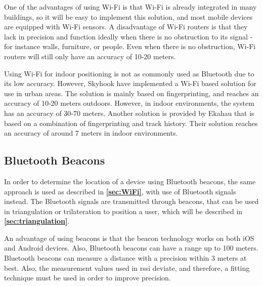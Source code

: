 One of the advantages of using Wi-Fi is that Wi-Fi is already integrated in many buildings, so it will be easy to implement this solution, and most mobile devices are equipped with Wi-Fi sensors.
A disadvantage of Wi-Fi routers is that they lack in precision and function ideally when there is no obstruction to its signal - for instance walls, furniture, or people. Even when there is no obstruction, Wi-Fi routers will still only have an accuracy of 10-20 meters.\cite{oriient}

Using Wi-Fi for indoor positioning is not as commonly used as Bluetooth due to its low accuracy. However, Skyhook have implemented a Wi-Fi based solution for use in urban areas\cite{skyhook}. The solution is mainly based on fingerprinting, and reaches an accuracy of 10-20 meters outdoors. However, in indoor environments, the system has an accuracy of 30-70 meters. Another solution is provided by Ekahau that is based on a combination of fingerprinting and track history. Their solution reaches an accuracy of around 7 meters in indoor environments.\cite{HabilitationThesis}


\subsection{Bluetooth Beacons}
In order to determine the location of a device using Bluetooth beacons, the same approach is used as described in \textbf{\autoref{sec:WiFi}}, with use of Bluetooth signals instead. The Bluetooth signals are transmitted through beacons, that can be used in triangulation or trilateration to position a user, which will be described in \textbf{\autoref{sec:triangulation}}.

An advantage of using beacons is that the beacon technology works on both iOS and Android devices.
Also, Bluetooth beacons can have a range up to 100 meters\cite{8419192}.
Bluetooth beacons can measure a distance with a precision within 3 meters at best.\cite{BluetoothBeacons} Also, the measurement values used in \gls{rssi} deviate, and therefore, a fitting technique must be used in order to improve precision\cite{RSSIWiFiDistance}.

